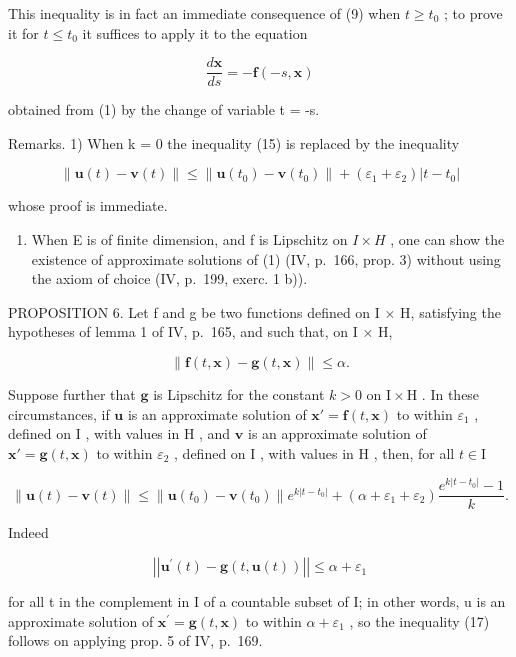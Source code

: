 This inequality is in fact an immediate consequence of (9) when \(t \geqslant t_0\) ; to prove it for \(t \leqslant t_0\) it suffices to apply it to the equation

\[
{\frac {d \mathbf {x}}{d s}} = - \mathbf {f} (- s, \mathbf {x})
\]

obtained from (1) by the change of variable t = -s.

Remarks. 1) When k = 0 the inequality (15) is replaced by the inequality

\[
\left\| \mathbf {u} (t) - \mathbf {v} (t) \right\| \leqslant \left\| \mathbf {u} \left(t _ {0}\right) - \mathbf {v} \left(t _ {0}\right) \right\| + \left(\varepsilon_ {1} + \varepsilon_ {2}\right) | t - t _ {0} |
\]

whose proof is immediate.

\begin{enumerate}
\def\labelenumi{\arabic{enumi})}
\setcounter{enumi}{1}
\tightlist
\item
  When E is of finite dimension, and f is Lipschitz on \(I \times H\) , one can show the existence of approximate solutions of (1) (IV, p.~166, prop. 3) without using the axiom of choice (IV, p.~199, exerc. 1 b)).
\end{enumerate}

PROPOSITION 6. Let f and g be two functions defined on I × H, satisfying the hypotheses of lemma 1 of IV, p.~165, and such that, on I × H,

\[
\left\| \mathbf {f} (t, \mathbf {x}) - \mathbf {g} (t, \mathbf {x}) \right\| \leqslant \alpha .\tag{16}
\]

Suppose further that \(\mathbf{g}\) is Lipschitz for the constant \(k > 0\) on \(\mathrm{I} \times \mathrm{H}\) . In these circumstances, if \(\mathbf{u}\) is an approximate solution of \(\mathbf{x}' = \mathbf{f}(t, \mathbf{x})\) to within \(\varepsilon_1\) , defined on \(\mathrm{I}\) , with values in \(\mathrm{H}\) , and \(\mathbf{v}\) is an approximate solution of \(\mathbf{x}' = \mathbf{g}(t, \mathbf{x})\) to within \(\varepsilon_2\) , defined on \(\mathrm{I}\) , with values in \(\mathrm{H}\) , then, for all \(t \in \mathrm{I}\)

\[
\| \mathbf {u} (t) - \mathbf {v} (t) \| \leqslant \| \mathbf {u} (t _ {0}) - \mathbf {v} (t _ {0}) \| e ^ {k | t - t _ {0} |} + (\alpha + \varepsilon_ {1} + \varepsilon_ {2}) \frac {e ^ {k | t - t _ {0} |} - 1}{k}.\tag{17}
\]

Indeed

\[
\left| \left| \mathbf {u} ^ {\prime} (t) - \mathbf {g} (t, \mathbf {u} (t)) \right| \right| \leqslant \alpha + \varepsilon_ {1}
\]

for all t in the complement in I of a countable subset of I; in other words, u is an approximate solution of \(\mathbf{x}^{\prime} = \mathbf{g}(t, \mathbf{x})\) to within \(\alpha + \varepsilon_{1}\) , so the inequality (17) follows on applying prop. 5 of IV, p.~169.

